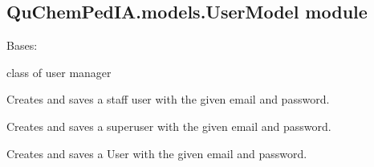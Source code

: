 \documentclass[letterpaper,10pt,english]{sphinxmanual}
\begin{document}
\subsection{QuChemPedIA.models.UserModel module}
\label{\detokenize{QuChemPedIA.models:module-QuChemPedIA.models.UserModel}}\label{\detokenize{QuChemPedIA.models:quchempedia-models-usermodel-module}}

\begin{fulllineitems}
\label{\detokenize{QuChemPedIA.models:QuChemPedIA.models.UserModel.UserManager}}
Bases: 

class of user manager

\begin{fulllineitems}
\label{\detokenize{QuChemPedIA.models:QuChemPedIA.models.UserModel.UserManager.create_staffuser}}
Creates and saves a staff user with the given email and password.

\end{fulllineitems}


\begin{fulllineitems}
\label{\detokenize{QuChemPedIA.models:QuChemPedIA.models.UserModel.UserManager.create_superuser}}
Creates and saves a superuser with the given email and password.

\end{fulllineitems}


\begin{fulllineitems}
\label{\detokenize{QuChemPedIA.models:QuChemPedIA.models.UserModel.UserManager.create_user}}
Creates and saves a User with the given email and password.

\end{fulllineitems}


\end{fulllineitems}
\end{document}
